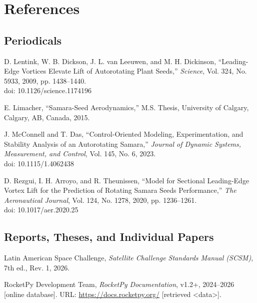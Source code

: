 \section{References}

\subsection{Periodicals}
\begin{ReportReferences}
    \item D. Lentink, W. B. Dickson, J. L. van Leeuwen, and M. H. Dickinson,
    ``Leading-Edge Vortices Elevate Lift of Autorotating Plant Seeds,''
    \emph{Science}, Vol. 324, No. 5933, 2009, pp. 1438--1440.\\
    doi: 10.1126/science.1174196
    \label{ref1}
    
    \item E. Limacher, ``Samara-Seed Aerodynamics,'' M.S. Thesis, University
    of Calgary, Calgary, AB, Canada, 2015.
    \label{ref2}
    
    \item J. McConnell and T. Das, ``Control-Oriented Modeling,
    Experimentation, and Stability Analysis of an Autorotating Samara,''
    \emph{Journal of Dynamic Systems, Measurement, and Control}, Vol. 145,
    No. 6, 2023.\\
    doi: 10.1115/1.4062438
    \label{ref3}
    
    \item D. Rezgui, I. H. Arroyo, and R. Theunissen, ``Model for Sectional
    Leading-Edge Vortex Lift for the Prediction of Rotating Samara Seeds
    Performance,'' \emph{The Aeronautical Journal}, Vol. 124, No. 1278,
    2020, pp. 1236--1261.\\
    doi: 10.1017/aer.2020.25
    \label{ref4}
\end{ReportReferences}

\subsection{Reports, Theses, and Individual Papers}
\begin{ReportReferences}
    \item Latin American Space Challenge, \emph{Satellite Challenge
    Standards Manual (SCSM)}, 7th ed., Rev. 1, 2026.
    \label{ref5}
    
    \item RocketPy Development Team, \emph{RocketPy Documentation}, v1.2+,
    2024--2026 [online database]. URL: \url{https://docs.rocketpy.org/}
    [retrieved <data>].
    \label{ref6}
\end{ReportReferences}
